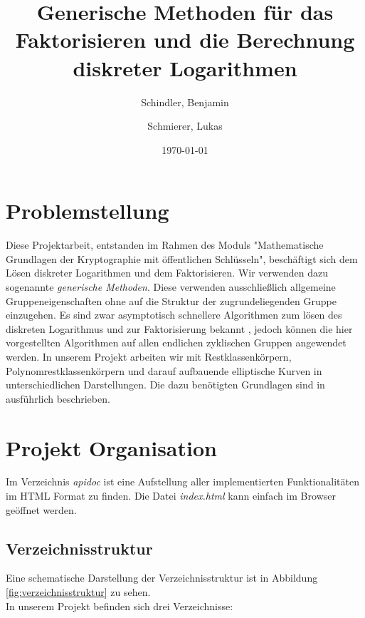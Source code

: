 \documentclass{scrartcl}
\begin{document}
\titlehead{
  Universität Leipzig \\
  Fakultät für Mathematik und Informatik \\
  Institut für Informatik
}
\subject{Projekt Dokumentation}
\title{Generische Methoden für das Faktorisieren und die Berechnung diskreter Logarithmen}
\author{Schindler, Benjamin \and Schmierer, Lukas}
\date{\today}
\publishers{Dr. Claus Diem}
\maketitle

\tableofcontents

\section{Problemstellung}
Diese Projektarbeit, entstanden im Rahmen des Moduls "Mathematische Grundlagen der Kryptographie mit öffentlichen Schlüsseln", beschäftigt sich dem Lösen diskreter Logarithmen und dem Faktorisieren. Wir verwenden dazu sogenannte \emph{generische Methoden}. Diese verwenden ausschließlich allgemeine Gruppeneigenschaften ohne auf die Struktur der zugrundeliegenden Gruppe einzugehen. Es sind zwar asymptotisch schnellere Algorithmen zum lösen des diskreten Logarithmus und zur Faktorisierung bekannt \cite{diem_2011, Adleman_1979, ECM, NFS}, jedoch können die hier vorgestellten Algorithmen auf allen endlichen zyklischen Gruppen angewendet werden. In unserem Projekt arbeiten wir mit Restklassenkörpern, Polynomrestklassenkörpern und darauf aufbauende elliptische Kurven in unterschiedlichen Darstellungen. Die dazu benötigten Grundlagen sind in \cite{Galbraith2012} ausführlich beschrieben. 
\section{Projekt Organisation}
Im Verzeichnis \emph{apidoc} ist eine Aufstellung aller implementierten Funktionalitäten
im HTML Format zu finden.
Die Datei \emph{index.html} kann einfach im Browser geöffnet werden.

\label{sec:organisation}

\subsection{Verzeichnisstruktur}
\label{sec:verzeichnisstruktur}
Eine schematische Darstellung der Verzeichnisstruktur ist in Abbildung \ref{fig:verzeichnisstruktur} zu sehen.\\
In unserem Projekt befinden sich drei Verzeichnisse:
\end{document}
